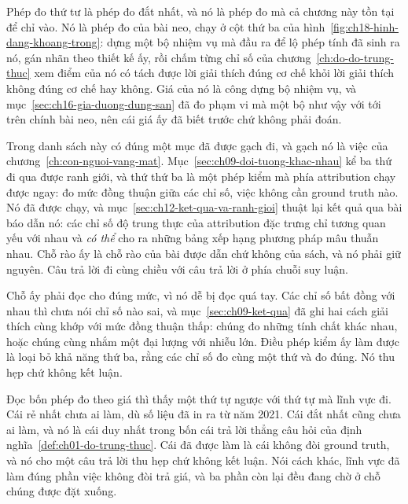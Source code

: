 %
Phép đo thứ tư là phép đo đắt nhất, và nó là phép đo mà cả chương này tồn tại để
chỉ vào. Nó là phép đo của bài neo, chạy ở cột thứ ba của
hình~\ref{fig:ch18-hinh-dang-khoang-trong}: dựng một bộ nhiệm vụ mà đầu ra để lộ
phép tính đã sinh ra nó, gán nhãn theo thiết kế ấy, rồi chấm từng chỉ số của
chương~\ref{ch:do-do-trung-thuc} xem điểm của nó có tách được lời giải thích đúng
cơ chế khỏi lời giải thích không đúng cơ chế hay không. Giá của nó là công dựng
bộ nhiệm vụ, và mục~\ref{sec:ch16-gia-duong-dung-san} đã đo phạm vi mà một bộ như
vậy với tới trên chính bài neo, nên cái giá ấy đã biết trước chứ không phải đoán.

%
Trong danh sách này có đúng một mục đã được gạch đi, và gạch nó là việc của
chương~\ref{ch:con-nguoi-vang-mat}. Mục~\ref{sec:ch09-doi-tuong-khac-nhau} kể ba
thứ đi qua được ranh giới, và thứ thứ ba là một phép kiểm mà phía attribution
chạy được ngay: đo mức đồng thuận giữa các chỉ số, việc không cần ground truth
nào. Nó đã được chạy, và
mục~\ref{sec:ch12-ket-qua-va-ranh-gioi} thuật lại kết quả qua bài báo dẫn nó: các
chỉ số độ trung thực của attribution đặc trưng chỉ tương quan yếu với nhau và
\emph{có thể} cho ra những bảng xếp hạng phương pháp mâu thuẫn nhau. Chỗ rào ấy
là chỗ rào của bài được dẫn chứ không của sách, và nó phải giữ nguyên. Câu trả
lời đi cùng chiều với câu trả lời ở phía chuỗi suy luận.

Chỗ ấy phải đọc cho đúng mức, vì nó dễ bị đọc quá tay. Các chỉ số bất đồng với
nhau thì chưa nói chỉ số nào sai, và
mục~\ref{sec:ch09-ket-qua} đã ghi hai cách giải thích cùng khớp với mức đồng
thuận thấp: chúng đo những tính chất khác nhau, hoặc chúng cùng nhắm một đại
lượng với nhiễu lớn. Điều phép kiểm ấy làm được là loại bỏ khả năng thứ ba, rằng
các chỉ số đo cùng một thứ và đo đúng. Nó thu hẹp chứ không kết luận.

%
Đọc bốn phép đo theo giá thì thấy một thứ tự ngược với thứ tự mà lĩnh vực đi. Cái
rẻ nhất chưa ai làm, dù số liệu đã in ra từ năm 2021. Cái đắt nhất cũng chưa ai
làm, và nó là cái duy nhất trong bốn cái trả lời thẳng câu hỏi của
định nghĩa~\ref{def:ch01-do-trung-thuc}. Cái đã được làm là cái không đòi ground
truth, và nó cho một câu trả lời thu hẹp chứ không kết luận. Nói cách khác, lĩnh
vực đã làm đúng phần việc không đòi trả giá, và ba phần còn lại đều đang chờ ở
chỗ chúng được đặt xuống.
